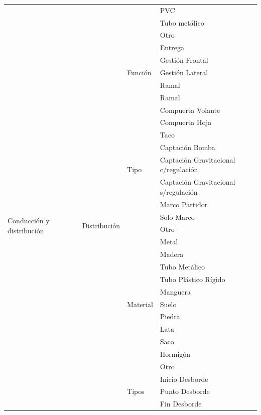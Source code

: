 \documentclass[]{article}
\begin{document}
\begin{longtable}{|p{3cm}|p{3.5cm}|p{3.5cm}|p{3.5cm}|}
    & & & PVC\\    \cline{4-4}
    & & & Tubo metálico\\    \cline{4-4}
    & & & Otro\\    \cline{2-4} 
    \multirow {49}{3cm}{Conducción y distribución} & \multirow {30}{3.5cm}{Distribución} & \multirow {5}{3.5cm}{Función} &  Entrega\\	\cline{4-4}
	& & & Gestión Frontal\\    \cline{4-4}
    & & & Gestión Lateral\\    \cline{4-4}
    & & & Ramal\\    \cline{4-4}
    & & & Ramal\\    \cline{3-4}
	& & \multirow {9}{3.5cm}{Tipo} &  Compuerta Volante\\	\cline{4-4}
    & & & Compuerta Hoja\\    \cline{4-4}
    & & & Taco\\    \cline{4-4}
    & & & Captación Bomba\\    \cline{4-4}
    & & & Captación Gravitacional c/regulación\\    \cline{4-4}
    & & & Captación Gravitacional s/regulación\\    \cline{4-4}
    & & & Marco Partidor\\    \cline{4-4}
    & & & Solo Marco\\    \cline{4-4}
    & & & Otro\\    \cline{3-4}
    & & \multirow {11}{3.5cm}{Material} &  Metal\\	\cline{4-4}
    & & & Madera\\    \cline{4-4}
    & & & Tubo Metálico\\    \cline{4-4}
    & & & Tubo Plástico Rígido\\    \cline{4-4}
    & & & Manguera\\    \cline{4-4}
    & & & Suelo\\    \cline{4-4}
    & & & Piedra\\    \cline{4-4}
    & & & Lata\\    \cline{4-4}
    & & & Saco\\    \cline{4-4}
    & & & Hormigón\\    \cline{4-4}
    & & & Otro\\  \cline{2-4}
    & \multirow {25}{3.5cm}{Observaciones} & \multirow {25}{3.5cm}{Tipos} & Inicio Desborde\\ \cline{4-4}
    & & & Punto Desborde\\ \cline{4-4}
    & & & Fin Desborde\\ \cline{4-4}

\end{longtable}
\end{document}

